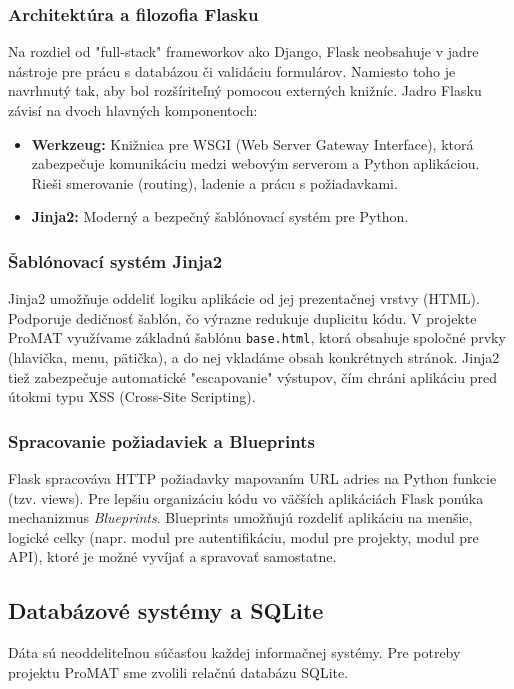 \documentclass[12pt, a4paper]{article}
\begin{document}
\begin{titlepage}
\subsubsection{Architektúra a filozofia Flasku}
Na rozdiel od "full-stack" frameworkov ako Django, Flask neobsahuje v jadre nástroje pre prácu s databázou či validáciu formulárov. Namiesto toho je navrhnutý tak, aby bol rozšíriteľný pomocou externých knižníc. Jadro Flasku závisí na dvoch hlavných komponentoch:
\begin{itemize}
    \item \textbf{Werkzeug:} Knižnica pre WSGI (Web Server Gateway Interface), ktorá zabezpečuje komunikáciu medzi webovým serverom a Python aplikáciou. Rieši smerovanie (routing), ladenie a prácu s požiadavkami.
    \item \textbf{Jinja2:} Moderný a bezpečný šablónovací systém pre Python.
\end{itemize}

\subsubsection{Šablónovací systém Jinja2}
Jinja2 umožňuje oddeliť logiku aplikácie od jej prezentačnej vrstvy (HTML). Podporuje dedičnosť šablón, čo výrazne redukuje duplicitu kódu. V projekte ProMAT využívame základnú šablónu \texttt{base.html}, ktorá obsahuje spoločné prvky (hlavička, menu, pätička), a do nej vkladáme obsah konkrétnych stránok. Jinja2 tiež zabezpečuje automatické "escapovanie" výstupov, čím chráni aplikáciu pred útokmi typu XSS (Cross-Site Scripting).

\subsubsection{Spracovanie požiadaviek a Blueprints}
Flask spracováva HTTP požiadavky mapovaním URL adries na Python funkcie (tzv. views). Pre lepšiu organizáciu kódu vo väčších aplikáciách Flask ponúka mechanizmus \textit{Blueprints}. Blueprints umožňujú rozdeliť aplikáciu na menšie, logické celky (napr. modul pre autentifikáciu, modul pre projekty, modul pre API), ktoré je možné vyvíjať a spravovať samostatne.

\subsection{Databázové systémy a SQLite}
Dáta sú neoddeliteľnou súčasťou každej informačnej systémy. Pre potreby projektu ProMAT sme zvolili relačnú databázu SQLite.


\end{titlepage}
\end{document}
